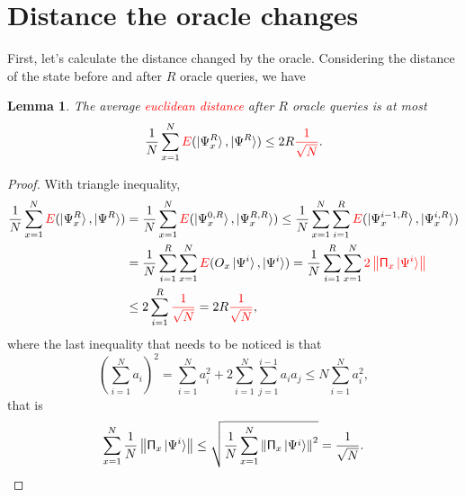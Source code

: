 \documentclass[a4paper,10pt]{book}
\newtheorem{lemma}{Lemma}[section]
\numberwithin{equation}{section}
\begin{document}
\section{\label{DistanceByOracle}Distance the oracle changes}

First, let's calculate the distance changed by the oracle. Considering the distance of the state before and after $R$ oracle queries, we have
\begin{lemma}
    The average \textcolor{red}{euclidean distance} after $R$ oracle queries is at most
    \begin{equation}
        \frac{1}{N}\sum_{x=1}^{N}\textcolor{red}{E}(\ket{\Psi_{x}^{R}},\ket{\Psi^{R}})\leq 2R\textcolor{red}{\frac{1}{\sqrt{N}}}.
    \end{equation}
\end{lemma}
\begin{proof}
    With triangle inequality,
    \begin{equation*}
        \begin{split}
            \frac{1}{N}\sum_{x=1}^{N}\textcolor{red}{E}(\ket{\Psi_{x}^{R}},\ket{\Psi^{R}})
             & = \frac{1}{N}\sum_{x=1}^{N}\textcolor{red}{E}(\ket{\Psi_{x}^{0,R}},\ket{\Psi_{x}^{R,R}})
            \leq \frac{1}{N}\sum_{x=1}^{N}\sum_{i=1}^{R}\textcolor{red}{E}(\ket{\Psi_{x}^{i-1,R}},\ket{\Psi_{x}^{i,R}}) \\
             & = \frac{1}{N}\sum_{i=1}^{R}\sum_{x=1}^{N}\textcolor{red}{E}(O_{x}\ket{\Psi^{i}},\ket{\Psi^{i}})
            = \frac{1}{N}\sum_{i=1}^{R}\sum_{x=1}^{N}\textcolor{red}{2\left\|\mathsf{\Pi}_{x}\ket{\Psi^{i}}\right\|}    \\
             & \leq 2\sum_{i=1}^{R}\textcolor{red}{\frac{1}{\sqrt{N}}} = 2R\textcolor{red}{\frac{1}{\sqrt{N}}},
        \end{split}
    \end{equation*}
    where the last inequality that needs to be noticed is that
    \begin{equation}\label{Cauchy-Schwarz}
        \left(\sum_{i=1}^{N}a_{i}\right)^{2}=\sum_{i=1}^{N}a_{i}^{2}+2\sum_{i=1}^{N}\sum_{j=1}^{i-1}a_{i}a_{j}\leq N\sum_{i=1}^{N}a_{i}^{2},
    \end{equation}
    that is
    \begin{equation*}
        \sum_{x=1}^{N}\frac{1}{N}\left\|\mathsf{\Pi}_{x}\ket{\Psi^{i}}\right\|\leq \sqrt{\frac{1}{N}\sum_{x=1}^{N}\left\|\mathsf{\Pi}_{x}\ket{\Psi^{i}}\right\|^{2}}=\frac{1}{\sqrt{N}}. \qedhere
    \end{equation*}
\end{proof}
\end{document}
